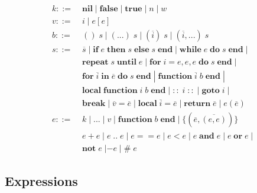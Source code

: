 \documentclass[12pt]{article}
\newcommand{\pipe}{\;|\;}
\begin{document}
\begin{align*}
k ::= \; & \mathbf{nil} \pipe \mathbf{false} \pipe \mathbf{true}
\pipe n \pipe w\\ 
v ::= \; & i \pipe e[e]\\
b ::= \; & () \; s \pipe ({...}) \; s
\pipe (\overline{i}) \; s \pipe (\overline{i}, {...}) \; s\\
s ::= \; & \overline{s}
\pipe \mathbf{if} \; e \; \mathbf{then} \; s \; \mathbf{else} \; s \; \mathbf{end}
\pipe \mathbf{while} \; e \; \mathbf{do} \; s \; \mathbf{end} \pipe\\
& \mathbf{repeat} \; s \; \mathbf{until} \; e
\pipe \mathbf{for} \; i = e,e,e \; \mathbf{do} \; s \; \mathbf{end} \pipe\\
& \mathbf{for} \; \overline{i} \; \mathbf{in} \; \overline{e} \;
  \mathbf{do} \; s \; \mathbf{end}
\pipe \mathbf{function} \; \overline{i} \; b \; \mathbf{end} \pipe\\
& \mathbf{local} \; \mathbf{function} \; i \; b \; \mathbf{end}
\pipe \mathbf{::} \; i \; \mathbf{::} \pipe \mathbf{goto} \; i \pipe\\
& \mathbf{break} \pipe \overline{v} = \overline{e}
\pipe \mathbf{local} \; \overline{i} = \overline{e}
\pipe \mathbf{return} \; \overline{e} \pipe e(\overline{e})\\
e ::= \; & k \pipe {...} \pipe v
\pipe \mathbf{function} \; b \; \mathbf{end}
\pipe \{(\overline{e},\overline{(e,e)})\}\\
& e + e \pipe e \; {..} \; e \pipe e == e \pipe e < e
\pipe e \; \mathbf{and} \; e \pipe e \; \mathbf{or} \; e \pipe\\
& \mathbf{not} \; e \; | - e \pipe \# \; e
\end{align*}

\subsection{Expressions}
\end{document}
